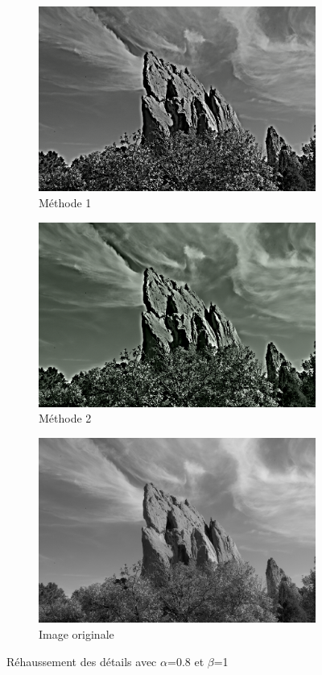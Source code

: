 \documentclass[twoside,UTF8]{EPURapport}
\begin{document}
\begin{figure}[H]
        \centering
        \begin{subfigure}[b]{0.3\textwidth}
                \includegraphics[scale=0.4]{images/rock_input1_08_1.png} 
                \caption{Méthode 1}
        \end{subfigure}
        \qquad \qquad
        \begin{subfigure}[b]{0.3\textwidth}
                \includegraphics[scale=0.4]{images/rock_input2_08_1.png}
                \caption{Méthode 2}
        \end{subfigure}
        
        \begin{subfigure}[b]{0.3\textwidth}
                \includegraphics[scale=0.4]{images/rock_input.png}
             	\caption{Image originale}
        \end{subfigure}
        \caption{Réhaussement des détails avec $\alpha$=0.8 et $\beta$=1 }
\end{figure}
\end{document}

